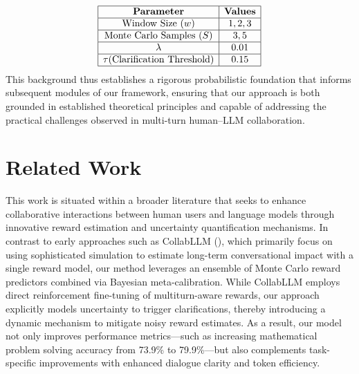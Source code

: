 \documentclass{article} %
\begin{document}
\[
\begin{array}{|c|c|}
\hline
\textbf{Parameter} & \textbf{Values} \\
\hline
\text{Window Size } (w) & 1, 2, 3 \\
\hline
\text{Monte Carlo Samples } (S) & 3, 5 \\
\hline
\lambda & 0.01 \\
\hline
\tau (\text{Clarification Threshold}) & 0.15 \\
\hline
\end{array}
\]
\label{tab:ensemble_settings}
This background thus establishes a rigorous probabilistic foundation that informs subsequent modules of our framework, ensuring that our approach is both grounded in established theoretical principles and capable of addressing the practical challenges observed in multi-turn human–LLM collaboration.

\section{Related Work}
This work is situated within a broader literature that seeks to enhance collaborative interactions between human users and language models through innovative reward estimation and uncertainty quantification mechanisms. In contrast to early approaches such as CollabLLM (\cite{wu2025collabllm}), which primarily focus on using sophisticated simulation to estimate long-term conversational impact with a single reward model, our method leverages an ensemble of Monte Carlo reward predictors combined via Bayesian meta-calibration. While CollabLLM employs direct reinforcement fine-tuning of multiturn-aware rewards, our approach explicitly models uncertainty to trigger clarifications, thereby introducing a dynamic mechanism to mitigate noisy reward estimates. As a result, our model not only improves performance metrics—such as increasing mathematical problem solving accuracy from 73.9\% to 79.9\%—but also complements task-specific improvements with enhanced dialogue clarity and token efficiency.
\end{document}
